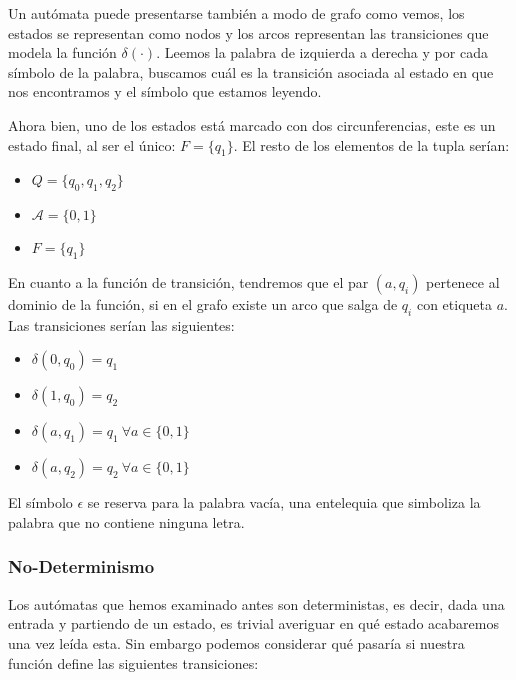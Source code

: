Un autómata puede presentarse también a modo de grafo como vemos, los estados se representan como nodos y los arcos representan las transiciones que modela la función $\delta(\cdot)$. Leemos la palabra de izquierda a derecha y por cada símbolo de la palabra, buscamos cuál es la transición asociada al estado en que nos encontramos y el símbolo que estamos leyendo.

\vspace{10px}

Ahora bien, uno de los estados está marcado con dos circunferencias, este es un estado final, al ser el único: $F = \{q_1\}$. El resto de los elementos de la tupla serían:

\begin{multicols}{2}
	\begin{itemize}
		\item $Q =\{q_0,q_1,q_2\}$
		\item $\mathcal{A} = \{0,1\}$
		\item $F = \{q_1\}$
	\end{itemize}
	
\end{multicols}

En cuanto a la función de transición, tendremos que el par $(a,q_i)$ pertenece al dominio de la función, si en el grafo existe un arco que salga de $q_i$ con etiqueta $a$. Las transiciones serían las siguientes:

\begin{multicols}{2}
	\begin{itemize}
		\item $\delta(0,q_0)=q_1$
		\item $\delta(1,q_0)=q_2$
		\item $\delta(a,q_1)=q_1 \ \forall a \in \{0,1\}$
		\item $\delta(a,q_2)=q_2 \ \forall a \in \{0,1\}$
	\end{itemize}
\end{multicols}

El símbolo $\epsilon$ se reserva para la palabra vacía, una entelequia que simboliza la palabra que no contiene ninguna letra.





\subsubsection{No-Determinismo}

Los autómatas que hemos examinado antes son deterministas, es decir, dada una entrada y partiendo de un estado, es trivial averiguar en qué estado acabaremos una vez leída esta. Sin embargo podemos considerar qué pasaría si nuestra función define las siguientes transiciones:


